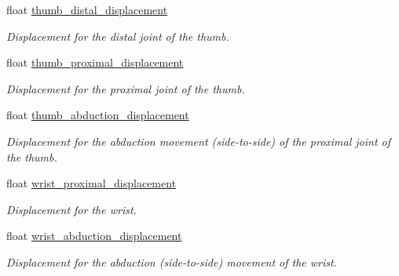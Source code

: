 \begin{DoxyCompactItemize}
\mbox{\label{struct_displacement_context_a4e60042d4bea7e43e5d84abdd457327b}} 
float \hyperlink{struct_displacement_context_a4e60042d4bea7e43e5d84abdd457327b}{thumb\+\_\+distal\+\_\+displacement}
\begin{DoxyCompactList}\small\item\em Displacement for the distal joint of the thumb. \end{DoxyCompactList}\item 
\mbox{\label{struct_displacement_context_a830da841fb1dcfa5d6a4d72559957dfe}} 
float \hyperlink{struct_displacement_context_a830da841fb1dcfa5d6a4d72559957dfe}{thumb\+\_\+proximal\+\_\+displacement}
\begin{DoxyCompactList}\small\item\em Displacement for the proximal joint of the thumb. \end{DoxyCompactList}\item 
\mbox{\label{struct_displacement_context_a34ad5545b9733899c469e067bfb240d4}} 
float \hyperlink{struct_displacement_context_a34ad5545b9733899c469e067bfb240d4}{thumb\+\_\+abduction\+\_\+displacement}
\begin{DoxyCompactList}\small\item\em Displacement for the abduction movement (side-\/to-\/side) of the proximal joint of the thumb. \end{DoxyCompactList}\item 
\mbox{\label{struct_displacement_context_a674146b3db62a0940e375287499adbc2}} 
float \hyperlink{struct_displacement_context_a674146b3db62a0940e375287499adbc2}{wrist\+\_\+proximal\+\_\+displacement}
\begin{DoxyCompactList}\small\item\em Displacement for the wrist. \end{DoxyCompactList}\item 
\mbox{\label{struct_displacement_context_a67522714a291393522ad976ed67fcb8e}} 
float \hyperlink{struct_displacement_context_a67522714a291393522ad976ed67fcb8e}{wrist\+\_\+abduction\+\_\+displacement}
\begin{DoxyCompactList}\small\item\em Displacement for the abduction (side-\/to-\/side) movement of the wrist. \end{DoxyCompactList}\end{DoxyCompactItemize}


